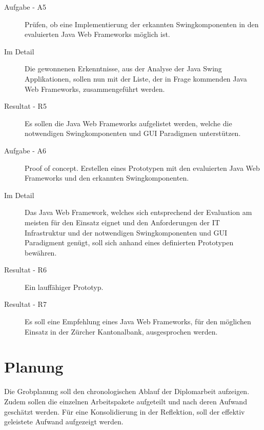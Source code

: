   \begin{description}
    \item[Aufgabe - A5\label{itm:Aufgabe-05}]
    \begin{itshape}Prüfen, ob eine Implementierung der erkannten
    Swingkomponenten in den evaluierten Java Web Frameworks möglich
    ist.\end{itshape}
    \item[Im Detail\label{itm:Detail-05}]
    Die gewonnenen Erkenntnisse, aus der Analyse der Java Swing Applikationen,
    sollen nun mit der Liste, der in Frage kommenden Java Web Frameworks,
    zusammengeführt werden.
    \item[Resultat - R5\label{itm:Resultat-05}]
    Es sollen die Java Web Frameworks aufgelistet werden, welche die
    notwendigen Swingkomponenten und GUI Paradigmen unterstützen.
  \end{description}

  \begin{description}
    \item[Aufgabe - A6\label{itm:Aufgabe-06}]
    \begin{itshape}Proof of concept. Erstellen eines Prototypen mit den
    evaluierten Java Web Frameworks und den erkannten
    Swingkomponenten.\end{itshape}
    \item[Im Detail\label{itm:Detail-06}]
    Das Java Web Framework, welches sich entsprechend der Evaluation am meisten
    für den Einsatz eignet und den Anforderungen der IT Infrastruktur und der
    notwendigen Swingkomponenten und GUI Paradigment genügt, soll sich anhand
    eines definierten Prototypen bewähren.
    \item[Resultat - R6\label{itm:Resultat-06}]
    Ein lauffähiger Prototyp.
    \item[Resultat - R7\label{itm:Resultat-07}]
    Es soll eine Empfehlung eines Java Web Frameworks, für den möglichen Einsatz
    in der Zürcher Kantonalbank, ausgesprochen werden.
  \end{description}
  
  \section{Planung}
  
  Die Grobplanung soll den chronologischen Ablauf der Diplomarbeit aufzeigen.
  Zudem sollen die einzelnen Arbeitspakete aufgeteilt und nach deren Aufwand
  geschätzt werden. Für eine Konsolidierung in der Reflektion, soll der effektiv
  geleistete Aufwand aufgezeigt werden.
  
